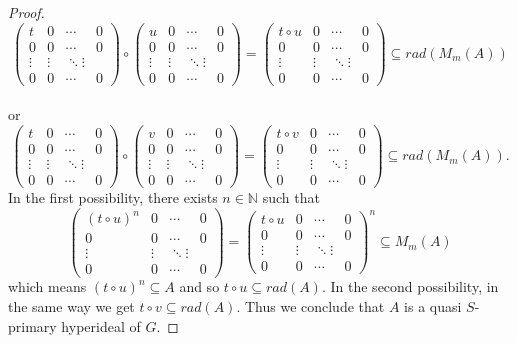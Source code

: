 \documentclass[preprint,review,10pt]{amsart}
\theoremstyle{definition}
\theoremstyle{remark}
\numberwithin{equation}{section}
\begin{document}
\begin{proof}
\[ \begin{pmatrix}
t & 0 & \cdots & 0\\
0 & 0 & \cdots & 0\\
\vdots& \vdots & \ddots \vdots\\
0 & 0 & \cdots & 0
\end{pmatrix} 
\circ 
\begin{pmatrix}
u & 0 & \cdots & 0\\
0 & 0 & \cdots & 0\\
\vdots& \vdots & \ddots \vdots\\
0 & 0 & \cdots & 0
\end{pmatrix}
=
\begin{pmatrix}
t \circ u & 0 & \cdots & 0\\
0 & 0 & \cdots & 0\\
\vdots& \vdots & \ddots \vdots\\
0 & 0 & \cdots & 0
\end{pmatrix}
\subseteq rad(M_m(A))\]\\
or 
\[ \begin{pmatrix}
t & 0 & \cdots & 0\\
0 & 0 & \cdots & 0\\
\vdots& \vdots & \ddots \vdots\\
0 & 0 & \cdots & 0
\end{pmatrix} 
\circ 
\begin{pmatrix}
v & 0 & \cdots & 0\\
0 & 0 & \cdots & 0\\
\vdots& \vdots & \ddots \vdots\\
0 & 0 & \cdots & 0
\end{pmatrix}
=
\begin{pmatrix}
t \circ v & 0 & \cdots & 0\\
0 & 0 & \cdots & 0\\
\vdots& \vdots & \ddots \vdots\\
0 & 0 & \cdots & 0
\end{pmatrix}
\subseteq rad(M_m(A)).\] 
In the first possibility, there exists $n \in \mathbb{N}$ such that 
\[\begin{pmatrix}
(t \circ u)^n & 0 & \cdots & 0\\
0 & 0 & \cdots & 0\\
\vdots& \vdots & \ddots \vdots\\
0 & 0 & \cdots & 0
\end{pmatrix}=
\begin{pmatrix}
t \circ u & 0 & \cdots & 0\\
0 & 0 & \cdots & 0\\
\vdots& \vdots & \ddots \vdots\\
0 & 0 & \cdots & 0
\end{pmatrix}^n \subseteq M_m(A)\]
which means $(t \circ  u)^n  \subseteq A$ and so $t \circ  u \subseteq rad(A)$. In the second possibility, in the same way we get  $t \circ  v \subseteq rad(A)$. Thus we conclude that  $A$ is a quasi $S$-primary hyperideal of $G$. 
\end{proof}
\end{document}
